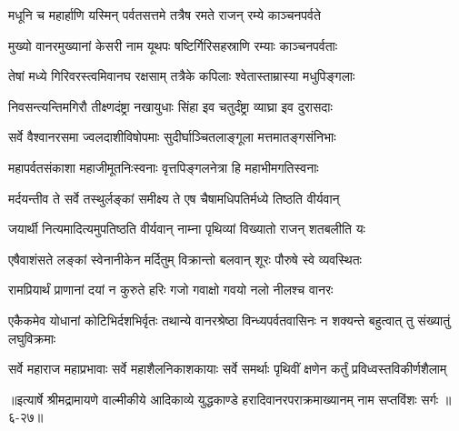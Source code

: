 \twolineshloka
{मधूनि च महार्हाणि यस्मिन् पर्वतसत्तमे}
{तत्रैष रमते राजन् रम्ये काञ्चनपर्वते} %

\twolineshloka
{मुख्यो वानरमुख्यानां केसरी नाम यूथपः}
{षष्टिर्गिरिसहस्राणि रम्याः काञ्चनपर्वताः} %

\twolineshloka
{तेषां मध्ये गिरिवरस्त्वमिवानघ रक्षसाम्}
{तत्रैके कपिलाः श्वेतास्ताम्रास्या मधुपिङ्गलाः} %

\twolineshloka
{निवसन्त्यन्तिमगिरौ तीक्ष्णदंष्ट्रा नखायुधाः}
{सिंहा इव चतुर्दंष्ट्रा व्याघ्रा इव दुरासदाः} %

\twolineshloka
{सर्वे वैश्वानरसमा ज्वलदाशीविषोपमाः}
{सुदीर्घाञ्चितलाङ्गूला मत्तमातङ्गसंनिभाः} %

\twolineshloka
{महापर्वतसंकाशा महाजीमूतनिःस्वनाः}
{वृत्तपिङ्गलनेत्रा हि महाभीमगतिस्वनाः} %

\twolineshloka
{मर्दयन्तीव ते सर्वे तस्थुर्लङ्कां समीक्ष्य ते}
{एष चैषामधिपतिर्मध्ये तिष्ठति वीर्यवान्} %

\twolineshloka
{जयार्थी नित्यमादित्यमुपतिष्ठति वीर्यवान्}
{नाम्ना पृथिव्यां विख्यातो राजन् शतबलीति यः} %

\twolineshloka
{एषैवाशंसते लङ्कां स्वेनानीकेन मर्दितुम्}
{विक्रान्तो बलवान् शूरः पौरुषे स्वे व्यवस्थितः} %

\twolineshloka
{रामप्रियार्थं प्राणानां दयां न कुरुते हरिः}
{गजो गवाक्षो गवयो नलो नीलश्च वानरः} %

\threelineshloka
{एकैकमेव योधानां कोटिभिर्दशभिर्वृतः}
{तथान्ये वानरश्रेष्ठा विन्ध्यपर्वतवासिनः}
{न शक्यन्ते बहुत्वात् तु संख्यातुं लघुविक्रमाः} %

\twolineshloka
{सर्वे महाराज महाप्रभावाः सर्वे महाशैलनिकाशकायाः}
{सर्वे समर्थाः पृथिवीं क्षणेन कर्तुं प्रविध्वस्तविकीर्णशैलाम्} %


॥इत्यार्षे श्रीमद्रामायणे वाल्मीकीये आदिकाव्ये युद्धकाण्डे हरादिवानरपराक्रमाख्यानम् नाम सप्तविंशः सर्गः ॥६-२७॥
